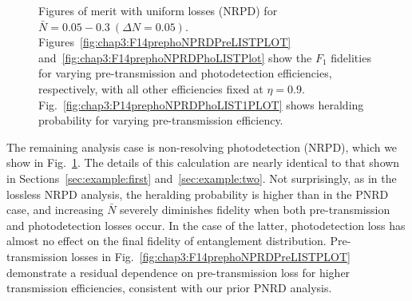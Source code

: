 \documentclass[aps,twocolumn,secnumarabic,amsmath,amssymb,pra,groupedaddress,
showpacs, showkeys]{revtex4-1}
\newcommand{\pna}[1]{\left(#1\right)}
\begin{document}
\begin{figure}[ht]
\centering
{}
\caption{\label{fig:chap3:nrpd_lossy} Figures of merit with uniform losses (NRPD) for $\bar{N}=0.05-0.3~\pna{\Delta N = 0.05}$. Figures~\ref{fig:chap3:F14prephoNPRDPreLISTPLOT} and~\ref{fig:chap3:F14prephoNPRDPhoLISTPlot} show the $F_1$ fidelities for varying pre-transmission and photodetection efficiencies, respectively, with all other efficiencies fixed at $\eta=0.9$. Fig.~\ref{fig:chap3:P14prephoNPRDPhoLIST1PLOT} shows heralding probability for varying pre-transmission efficiency.}
\end{figure}

The remaining analysis case is non-resolving photodetection (NRPD), which we
show in Fig.~\ref{fig:chap3:nrpd_lossy}. The details of this calculation are
nearly identical to that shown in Sections~\ref{sec:example:first}
and~\ref{sec:example:two}. Not surprisingly, as in the lossless NRPD analysis,
the heralding probability is higher than in the PNRD case, and increasing
$\bar{N}$ severely diminishes fidelity when both pre-transmission and
photodetection losses occur. In the case of the latter, photodetection loss has
almost no effect on the final fidelity of entanglement
distribution. Pre-transmission losses in
Fig.~\ref{fig:chap3:F14prephoNPRDPreLISTPLOT} demonstrate a residual dependence
on pre-transmission loss for higher transmission efficiencies, consistent with
our prior PNRD analysis. 
\end{document}
